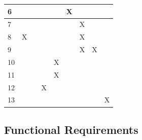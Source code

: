 \documentclass[12pt, titlepage]{article}
\begin{document}
\begin{table}[ht]
{\begin{tabular}{lllllllll}
\multicolumn{1}{|l|}{6}      & \multicolumn{1}{l|}{}  & \multicolumn{1}{l|}{}  & \multicolumn{1}{l|}{}  & \multicolumn{1}{l|}{}  & \multicolumn{1}{l|}{X} & \multicolumn{1}{l|}{}  & \multicolumn{1}{l|}{}  & \multicolumn{1}{l|}{}  \\ \hline
\multicolumn{1}{|l|}{7}      & \multicolumn{1}{l|}{}  & \multicolumn{1}{l|}{}  & \multicolumn{1}{l|}{}  & \multicolumn{1}{l|}{}  & \multicolumn{1}{l|}{}  & \multicolumn{1}{l|}{X} & \multicolumn{1}{l|}{}  & \multicolumn{1}{l|}{}  \\ \hline
\multicolumn{1}{|l|}{8}      & \multicolumn{1}{l|}{X} & \multicolumn{1}{l|}{}  & \multicolumn{1}{l|}{}  & \multicolumn{1}{l|}{}  & \multicolumn{1}{l|}{}  & \multicolumn{1}{l|}{X} & \multicolumn{1}{l|}{}  & \multicolumn{1}{l|}{}  \\ \hline
\multicolumn{1}{|l|}{9}      & \multicolumn{1}{l|}{}  & \multicolumn{1}{l|}{}  & \multicolumn{1}{l|}{}  & \multicolumn{1}{l|}{}  & \multicolumn{1}{l|}{}  & \multicolumn{1}{l|}{X} & \multicolumn{1}{l|}{X} & \multicolumn{1}{l|}{}  \\ \hline
\multicolumn{1}{|l|}{10}     & \multicolumn{1}{l|}{}  & \multicolumn{1}{l|}{}  & \multicolumn{1}{l|}{}  & \multicolumn{1}{l|}{X} & \multicolumn{1}{l|}{}  & \multicolumn{1}{l|}{}  & \multicolumn{1}{l|}{}  & \multicolumn{1}{l|}{}  \\ \hline
\multicolumn{1}{|l|}{11}     & \multicolumn{1}{l|}{}  & \multicolumn{1}{l|}{}  & \multicolumn{1}{l|}{}  & \multicolumn{1}{l|}{X} & \multicolumn{1}{l|}{}  & \multicolumn{1}{l|}{}  & \multicolumn{1}{l|}{}  & \multicolumn{1}{l|}{}  \\ \hline
\multicolumn{1}{|l|}{12}     & \multicolumn{1}{l|}{}  & \multicolumn{1}{l|}{}  & \multicolumn{1}{l|}{X} & \multicolumn{1}{l|}{}  & \multicolumn{1}{l|}{}  & \multicolumn{1}{l|}{}  & \multicolumn{1}{l|}{}  & \multicolumn{1}{l|}{}  \\ \hline
\multicolumn{1}{|l|}{13}     & \multicolumn{1}{l|}{}  & \multicolumn{1}{l|}{}  & \multicolumn{1}{l|}{}  & \multicolumn{1}{l|}{}  & \multicolumn{1}{l|}{}  & \multicolumn{1}{l|}{}  & \multicolumn{1}{l|}{}  & \multicolumn{1}{l|}{X} \\ \hline
\end{tabular}}
\end{table}


\newpage

\subsection{Functional Requirements}
\end{document}

